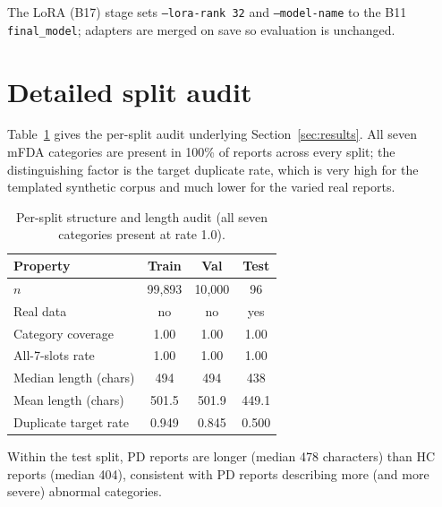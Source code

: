 \documentclass[11pt,twocolumn]{article}
\newcommand{\bt}[1]{\texttt{#1}}
\begin{document}
\noindent The LoRA (B17) stage sets \bt{--lora-rank 32} and \bt{--model-name} to the B11
\bt{final\_model}; adapters are merged on save so evaluation is unchanged.

\section{Detailed split audit}
\label{app:audit}
Table~\ref{tab:app-audit} gives the per-split audit underlying Section~\ref{sec:results}. All
seven mFDA categories are present in 100\% of reports across every split; the distinguishing
factor is the target duplicate rate, which is very high for the templated synthetic corpus and
much lower for the varied real reports.

\begin{table}[h]
\centering
\caption{Per-split structure and length audit (all seven categories present at rate 1.0).}
\label{tab:app-audit}
\small
\begin{tabular}{lccc}
\toprule
Property & Train & Val & Test \\
\midrule
$n$ & 99{,}893 & 10{,}000 & 96 \\
Real data & no & no & yes \\
Category coverage & 1.00 & 1.00 & 1.00 \\
All-7-slots rate & 1.00 & 1.00 & 1.00 \\
Median length (chars) & 494 & 494 & 438 \\
Mean length (chars) & 501.5 & 501.9 & 449.1 \\
Duplicate target rate & 0.949 & 0.845 & 0.500 \\
\bottomrule
\end{tabular}
\end{table}

\noindent Within the test split, PD reports are longer (median 478 characters) than HC reports
(median 404), consistent with PD reports describing more (and more severe) abnormal categories.
\end{document}
